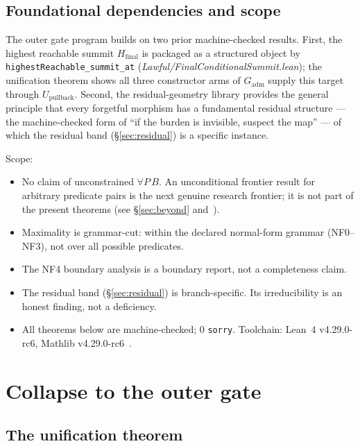 \documentclass[11pt]{article}
\theoremstyle{plain}
\theoremstyle{definition}
\theoremstyle{remark}
\newcommand{\Gadm}{G_{\mathrm{adm}}}
\newcommand{\Upb}{U_{\mathrm{pullback}}}
\newcommand{\lean}[1]{\texttt{\small #1}}
\newcommand{\leanmod}[1]{\textit{\small #1}}
\begin{document}
\subsection{Foundational dependencies and scope}

The outer gate program builds on two prior machine-checked results.
First, the highest reachable summit $H_{\mathrm{final}}$ is packaged as a
structured object by \lean{highestReachable\-\_summit\_at}
(\leanmod{Lawful/FinalConditional\-Summit.lean}); the unification theorem
shows all three constructor arms of $\Gadm$ supply this target through
$\Upb$.  Second, the residual-geometry library provides the general
principle that every forgetful morphism has a fundamental residual structure
--- the machine-checked form of ``if the burden is invisible, suspect the
map'' --- of which the residual band (\S\ref{sec:residual}) is a specific
instance.

Scope:

\begin{itemize}
  \item No claim of unconstrained $\forall P\,B$.  An unconditional
    frontier result for arbitrary predicate pairs is the next genuine
    research frontier; it is not part of the present theorems (see
    \S\ref{sec:beyond} and~\cite{SpivackAdequacy}).
  \item Maximality is grammar-cut: within the declared normal-form grammar
    (NF0--NF3), not over all possible predicates.
  \item The NF4 boundary analysis is a boundary report, not a completeness
    claim.
  \item The residual band (\S\ref{sec:residual}) is branch-specific.  Its
    irreducibility is an honest finding, not a deficiency.
  \item All theorems below are machine-checked; 0 \texttt{sorry}.
    Toolchain: Lean~4 v4.29.0-rc6, Mathlib v4.29.0-rc6~\cite{Mathlib}.
\end{itemize}

\section{Collapse to the outer gate}
\label{sec:gate}

\subsection{The unification theorem}
\end{document}
